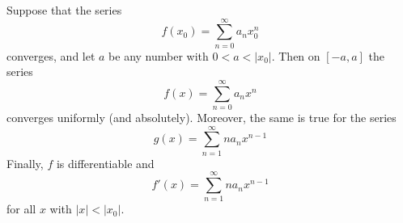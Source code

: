 \begin{theorem}
    Suppose that the series \begin{equation*}
        f(x_0) = \sum\limits_{n=0}^{\infty}a_nx_0^n
    \end{equation*}
    converges, and let $a$ be any number with $0 < a < |x_0|$. Then on $[-a,a]$ the series \begin{equation*}
        f(x) = \sum\limits_{n=0}^{\infty}a_nx^n
    \end{equation*}
    converges uniformly (and absolutely). Moreover, the same is true for the series \begin{equation*}
        g(x) = \sum\limits_{n=1}^{\infty}na_nx^{n-1}
    \end{equation*}
    Finally, $f$ is differentiable and \begin{equation*}
        f'(x) = \sum\limits_{n=1}^{\infty}na_nx^{n-1}
    \end{equation*}
    for all $x$ with $|x| < |x_0|$.
\end{theorem}
